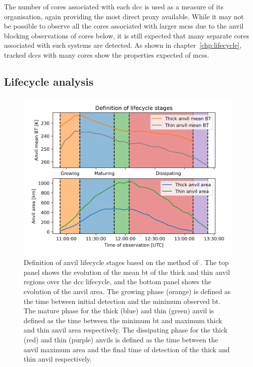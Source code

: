 The number of cores associated with each \acrshort{dcc} is used as a measure of its organisation, again providing the most direct proxy available.
While it may not be possible to observe all the cores associated with larger \acrshort{mcs}s due to the anvil blocking observations of cores below, it is still expected that many separate cores associated with such systems are detected.
As shown in chapter~\ref{chp:lifecycle}, tracked \acrshort{dcc}s with many cores show the properties expected of \acrshort{mcs}s.


\subsection{Lifecycle analysis} \label{sec:lifecycle_definition}


\begin{figure}[tp]
    \centering
    \includegraphics[width=\textwidth]{figures/chapter3_02.png}
    \caption[
    Definition of anvil lifecycle stages based on the method of \citet{futyan_deep_2007}
    ]{
    Definition of anvil lifecycle stages based on the method of \citet{futyan_deep_2007}. The top panel shows the evolution of the mean \acrshort{bt} of the thick and thin anvil regions over the \acrshort{dcc} lifecycle, and the bottom panel shows the evolution of the anvil area. The growing phase (orange) is defined as the time between initial detection and the minimum observed \acrshort{bt}. The mature phase for the thick (blue) and thin (green) anvil is defined as the time between the minimum \acrshort{bt} and maximum thick and thin anvil area respectively. The dissipating phase for the thick (red) and thin (purple) anvils is defined as the time between the anvil maximum area and the final time of detection of the thick and thin anvil respectively.
    }
    \label{fig:lifecycle_example}
\end{figure}

